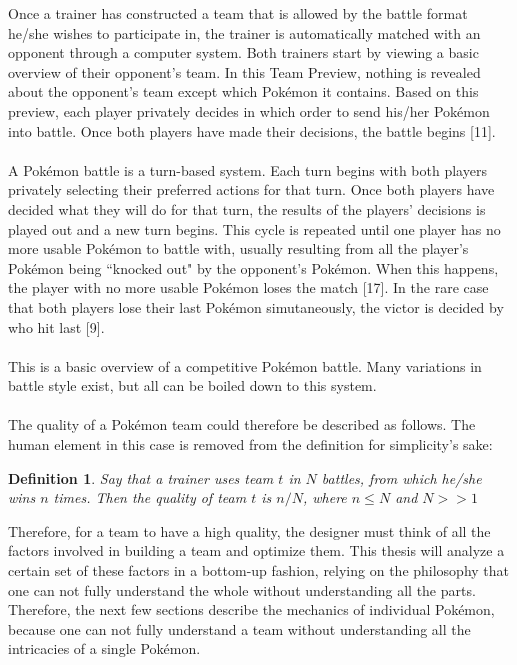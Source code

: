 \documentclass{article}
\newtheorem{definition}{Definition}
\begin{document}
Once a trainer has constructed a team that is allowed by the battle format he/she wishes to participate in, the trainer is automatically matched with an opponent through a computer system. Both trainers start by viewing a basic overview of their opponent's team. In this Team Preview, nothing is revealed about the opponent's team except which Pok\'emon it contains. Based on this preview, each player privately decides in which order to send his/her Pok\'emon into battle. Once both players have made their decisions, the battle begins [11].\\\\
A Pok\'emon battle is a turn-based system. Each turn begins with both players privately selecting their preferred actions for that turn. Once both players have decided what they will do for that turn, the results of the players' decisions is played out and a new turn begins. This cycle is repeated until one player has no more usable Pok\'emon to battle with, usually resulting from all the player's Pok\'emon being ``knocked out" by the opponent's Pok\'emon. When this happens, the player with no more usable Pok\'emon loses the match [17]. In the rare case that both players lose their last Pok\'emon simutaneously, the victor is decided by who hit last [9].\\\\
This is a basic overview of a competitive Pok\'emon battle. Many variations in battle style exist, but all can be boiled down to this system.\\\\
The quality of a Pok\'emon team could therefore be described as follows. The human element in this case is removed from the definition for simplicity's sake:
\begin{definition}\label{QualityDef}
	Say that a trainer uses team $t$ in $N$ battles, from which he/she wins $n$ times. Then the quality of team $t$ is $n/N$, where $n\le N$ and $N>\!>1$ 
\end{definition}
Therefore, for a team to have a high quality, the designer must think of all the factors involved in building a team and optimize them. This thesis will analyze a certain set of these factors in a bottom-up fashion, relying on the philosophy that one can not fully understand the whole without understanding all the parts. Therefore, the next few sections describe the mechanics of individual Pok\'emon, because one can not fully understand a team without understanding all the intricacies of a single Pok\'emon.
\end{document}
